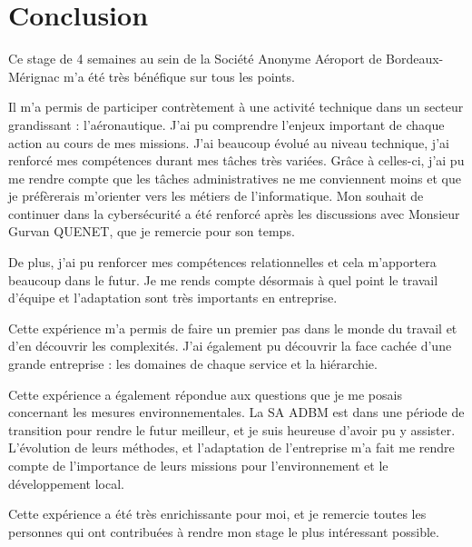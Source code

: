 \chapter{Conclusion}

Ce stage de 4 semaines au sein de la Société Anonyme Aéroport de Bordeaux-Mérignac m’a été très bénéfique sur tous les points.\newline

Il m'a permis de participer contrètement à une activité technique dans un secteur grandissant : l'aéronautique. J'ai pu comprendre l'enjeux important de chaque action au cours de mes missions. J'ai beaucoup évolué au niveau technique, j'ai renforcé mes compétences durant mes tâches très variées. Grâce à celles-ci, j'ai pu me rendre compte que les tâches administratives ne me conviennent moins et que je préfèrerais m'orienter vers les métiers de l'informatique. Mon souhait de continuer dans la cybersécurité a été renforcé après les discussions avec Monsieur Gurvan QUENET, que je remercie pour son temps.

De plus, j'ai pu renforcer mes compétences relationnelles et cela m'apportera beaucoup dans le futur. Je me rends compte désormais à quel point le travail d'équipe et l'adaptation sont très importants en entreprise.

Cette expérience m’a permis de faire un premier pas dans le monde du travail et d’en découvrir les complexités. J’ai également pu découvrir la face cachée d’une grande entreprise : les domaines de chaque service et la hiérarchie.

Cette expérience a également répondue aux questions que je me posais concernant les mesures environnementales. La SA ADBM est dans une période de transition pour rendre le futur meilleur, et je suis heureuse d'avoir pu y assister. L'évolution de leurs méthodes, et l'adaptation de l'entreprise m'a fait me rendre compte de l'importance de leurs missions pour l'environnement et le développement local.\newline

Cette expérience a été très enrichissante pour moi, et je remercie toutes les personnes qui ont contribuées à rendre mon stage le plus intéressant possible.
